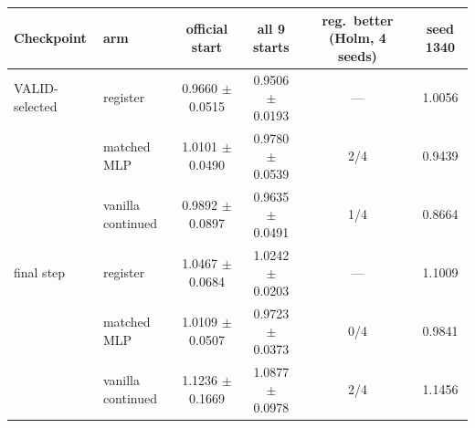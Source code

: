 \begin{tabular}{llcccc}
\toprule
Checkpoint & arm & official start & all 9 starts & reg.\ better (Holm, 4 seeds) & seed 1340 \\
\midrule
VALID-selected & register & 0.9660 $\pm$ 0.0515 & 0.9506 $\pm$ 0.0193 & --- & 1.0056 \\
 & matched MLP & 1.0101 $\pm$ 0.0490 & 0.9780 $\pm$ 0.0539 & 2/4 & 0.9439 \\
 & vanilla continued & 0.9892 $\pm$ 0.0897 & 0.9635 $\pm$ 0.0491 & 1/4 & 0.8664 \\
\midrule
final step & register & 1.0467 $\pm$ 0.0684 & 1.0242 $\pm$ 0.0203 & --- & 1.1009 \\
 & matched MLP & 1.0109 $\pm$ 0.0507 & 0.9723 $\pm$ 0.0373 & 0/4 & 0.9841 \\
 & vanilla continued & 1.1236 $\pm$ 0.1669 & 1.0877 $\pm$ 0.0978 & 2/4 & 1.1456 \\
\bottomrule
\end{tabular}
